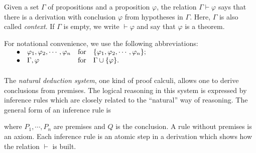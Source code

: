 Given a set $ \Gamma $ of propositions and a proposition $ \varphi $, the relation $ \Gamma \vdash \varphi $ says that there is a derivation with conclusion $ \varphi $ from hypotheses in $ \Gamma $. Here, $ \Gamma $ is also called \emph{context}. If $ \Gamma $ is empty, we write $ \vdash \varphi $ and say that $ \varphi $ is a theorem.

For notational convenience, we use the following abbreviations:\\
$
\begin{array}{rlll}
\hspace*{12pt} \bullet & \varphi _1 , \varphi _2 , \cdots , \varphi _n & \text{for} & \{ \varphi _1 , \varphi _2 , \cdots , \varphi _n \} ; \\
\bullet & \Gamma , \varphi & \text{for} & \Gamma \cup \{ \varphi \} .
\end{array}
$
\\
\\
The \emph{natural deduction system}, one kind of proof calculi, allows one to derive conclusions from premises. The logical reasoning in this system is expressed by inference rules which are closely related to the ``natural'' way of reasoning. The general form of an inference rule is
\begin{prooftree}
\end{prooftree}
where $ P_1 , \cdots , P_n $ are premises and $ Q $ is the conclusion. A rule without premises is an axiom. Each inference rule is an atomic step in a derivation which shows how the relation $ \vdash $ is built.


